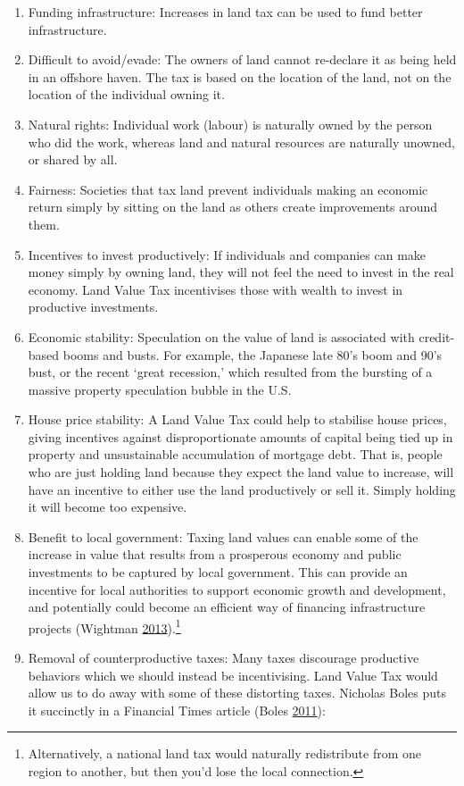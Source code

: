 \documentclass[]{tufte-handout}
\providecommand{\tightlist}{%
  \setlength{\itemsep}{0pt}\setlength{\parskip}{0pt}}
\begin{document}
\begin{enumerate}
\def\labelenumi{\arabic{enumi}.}
\tightlist
\item
  Funding infrastructure: Increases in land tax can be used to fund
  better infrastructure.
\item
  Difficult to avoid/evade: The owners of land cannot re-declare it as
  being held in an offshore haven. The tax is based on the location of
  the land, not on the location of the individual owning it.
\item
  Natural rights: Individual work (labour) is naturally owned by the
  person who did the work, whereas land and natural resources are
  naturally unowned, or shared by all.
\item
  Fairness: Societies that tax land prevent individuals making an
  economic return simply by sitting on the land as others create
  improvements around them.
\item
  Incentives to invest productively: If individuals and companies can
  make money simply by owning land, they will not feel the need to
  invest in the real economy. Land Value Tax incentivises those with
  wealth to invest in productive investments.
\item
  Economic stability: Speculation on the value of land is associated
  with credit-based booms and busts. For example, the Japanese late 80's
  boom and 90's bust, or the recent `great recession,' which resulted
  from the bursting of a massive property speculation bubble in the U.S.
\item
  House price stability: A Land Value Tax could help to stabilise house
  prices, giving incentives against disproportionate amounts of capital
  being tied up in property and unsustainable accumulation of mortgage
  debt. That is, people who are just holding land because they expect
  the land value to increase, will have an incentive to either use the
  land productively or sell it. Simply holding it will become too
  expensive.
\item
  Benefit to local government: Taxing land values can enable some of the
  increase in value that results from a prosperous economy and public
  investments to be captured by local government. This can provide an
  incentive for local authorities to support economic growth and
  development, and potentially could become an efficient way of
  financing infrastructure projects (Wightman
  \protect\hyperlink{ref-Wightman2013}{2013}).\footnote{Alternatively, a
    national land tax would naturally redistribute from one region to
    another, but then you'd lose the local connection.}
\item
  Removal of counterproductive taxes: Many taxes discourage productive
  behaviors which we should instead be incentivising. Land Value Tax
  would allow us to do away with some of these distorting taxes.
  Nicholas Boles puts it succinctly in a Financial Times article (Boles
  \protect\hyperlink{ref-Boles}{2011}):
\end{enumerate}
\end{document}
